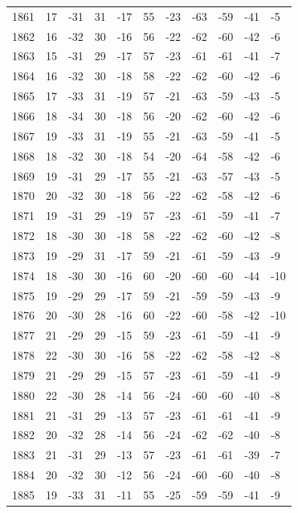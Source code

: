 \begin{table}[H]
\begin{tabular}{lllllllllll}
1861 & 17 & -31 & 31 & -17 & 55 & -23 & -63 & -59 & -41 & -5 \\
1862 & 16 & -32 & 30 & -16 & 56 & -22 & -62 & -60 & -42 & -6 \\
1863 & 15 & -31 & 29 & -17 & 57 & -23 & -61 & -61 & -41 & -7 \\
1864 & 16 & -32 & 30 & -18 & 58 & -22 & -62 & -60 & -42 & -6 \\
1865 & 17 & -33 & 31 & -19 & 57 & -21 & -63 & -59 & -43 & -5 \\
1866 & 18 & -34 & 30 & -18 & 56 & -20 & -62 & -60 & -42 & -6 \\
1867 & 19 & -33 & 31 & -19 & 55 & -21 & -63 & -59 & -41 & -5 \\
1868 & 18 & -32 & 30 & -18 & 54 & -20 & -64 & -58 & -42 & -6 \\
1869 & 19 & -31 & 29 & -17 & 55 & -21 & -63 & -57 & -43 & -5 \\
1870 & 20 & -32 & 30 & -18 & 56 & -22 & -62 & -58 & -42 & -6 \\
1871 & 19 & -31 & 29 & -19 & 57 & -23 & -61 & -59 & -41 & -7 \\
1872 & 18 & -30 & 30 & -18 & 58 & -22 & -62 & -60 & -42 & -8 \\
1873 & 19 & -29 & 31 & -17 & 59 & -21 & -61 & -59 & -43 & -9 \\
1874 & 18 & -30 & 30 & -16 & 60 & -20 & -60 & -60 & -44 & -10 \\
1875 & 19 & -29 & 29 & -17 & 59 & -21 & -59 & -59 & -43 & -9 \\
1876 & 20 & -30 & 28 & -16 & 60 & -22 & -60 & -58 & -42 & -10 \\
1877 & 21 & -29 & 29 & -15 & 59 & -23 & -61 & -59 & -41 & -9 \\
1878 & 22 & -30 & 30 & -16 & 58 & -22 & -62 & -58 & -42 & -8 \\
1879 & 21 & -29 & 29 & -15 & 57 & -23 & -61 & -59 & -41 & -9 \\
1880 & 22 & -30 & 28 & -14 & 56 & -24 & -60 & -60 & -40 & -8 \\
1881 & 21 & -31 & 29 & -13 & 57 & -23 & -61 & -61 & -41 & -9 \\
1882 & 20 & -32 & 28 & -14 & 56 & -24 & -62 & -62 & -40 & -8 \\
1883 & 21 & -31 & 29 & -13 & 57 & -23 & -61 & -61 & -39 & -7 \\
1884 & 20 & -32 & 30 & -12 & 56 & -24 & -60 & -60 & -40 & -8 \\
1885 & 19 & -33 & 31 & -11 & 55 & -25 & -59 & -59 & -41 & -9 \\

\end{tabular}
\end{table}
